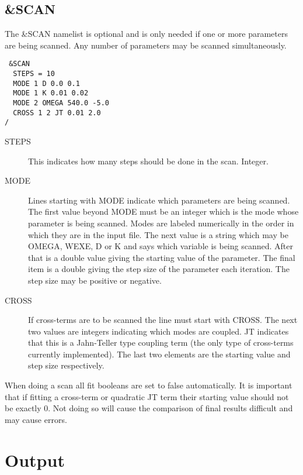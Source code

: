 \documentclass{article}
\begin{document}
\subsection{\&SCAN} \label{scan}

The \&SCAN namelist is optional and is only needed if one or more parameters
are being scanned. Any number of parameters may be scanned simultaneously.

\begin{verbatim}
 &SCAN
  STEPS = 10
  MODE 1 D 0.0 0.1
  MODE 1 K 0.01 0.02
  MODE 2 OMEGA 540.0 -5.0
  CROSS 1 2 JT 0.01 2.0
/
\end{verbatim}

\begin{description}
\item[STEPS] This indicates how many steps should be done in the scan.
Integer.

\item[MODE] Lines starting with MODE indicate which parameters are being 
scanned. The first value beyond MODE must be an integer which is the mode
whose parameter is being scanned. Modes are labeled numerically in the order
in which they are in the input file. The next value is a string which may be
OMEGA, WEXE, D or K and says which variable is being scanned. After that 
is a double value giving the starting value of the parameter. The final
item is a double giving the step size of the parameter each iteration. 
The step size may be positive or negative.

\item[CROSS] If cross-terms are to be scanned the line must start with 
CROSS. The next two values are integers indicating which modes are coupled.
JT indicates that this is a Jahn-Teller type coupling term (the only type
of cross-terms currently implemented). The last two elements are the starting
value and step size respectively.

\end{description}

When doing a scan all fit booleans are set to false automatically. It is important
that if fitting a cross-term or quadratic JT term their starting value should not
be exactly 0. Not doing so will cause the comparison of final results difficult and may
cause errors.

\section{Output} \label{section:output}
\end{document}
